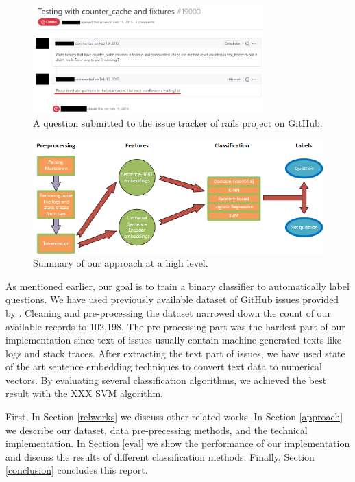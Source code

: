 \documentclass[conference]{IEEEtran}
\begin{document}
\begin{figure}[t]
  \centerline{\includegraphics[width=3.5in]{./figures/q-issue.png}}
  \caption{A question submitted to the issue tracker of rails project on GitHub.}
  \label{fig:qissue}
\end{figure}

\begin{figure}[t]
  \centerline{\includegraphics{./figures/process.png}}
  \caption{Summary of our approach at a high level.}
  \label{fig:process}
\end{figure}

As mentioned earlier, our goal is to train a binary classifier to automatically label questions.
We have used previously available dataset of GitHub issues provided by \cite{8816794}.
Cleaning and pre-processing the dataset narrowed down the count of our available 
records to 102,198. The pre-processing part was the hardest part of our implementation
since text of issues usually contain machine generated texts like logs and stack traces. 
After extracting the text part of issues, we have used state of the art sentence embedding techniques
to convert text data to numerical vectors. By evaluating several classification 
algorithms, we achieved the best result with the XXX SVM algorithm.



First, In Section \ref{relworks} we discuss other related works. 
In Section \ref{approach} we describe our dataset, data pre-precessing methods, 
and the technical implementation. In Section \ref{eval} we show the performance of our implementation
and discuss the results of different classification methods.
Finally, Section \ref{conclusion} concludes this report.
\end{document}
